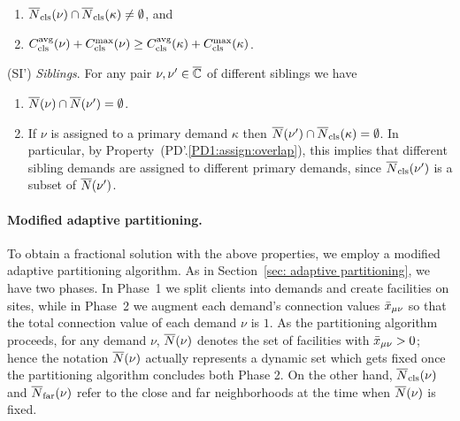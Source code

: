 \documentclass[oneside,final]{ucr}
\begin{document}
\begin{description}
\begin{enumerate}
\begin{enumerate}
				\item \label{PD1:assign:overlap} ${\overline{N}}_{{\mbox{\scriptsize\rm cls}}}(\nu) \cap {\overline{N}}_{{\mbox{\scriptsize\rm cls}}}(\kappa) \neq \emptyset$, and
				\item \label{PD1:assign:cost}
          $C_{{\mbox{\scriptsize\rm cls}}}^{{\mbox{\scriptsize\rm avg}}}(\nu)+C_{{\mbox{\scriptsize\rm cls}}}^{\max}(\nu) \geq
          C_{{\mbox{\scriptsize\rm cls}}}^{{\mbox{\scriptsize\rm avg}}}(\kappa)+C_{{\mbox{\scriptsize\rm cls}}}^{\max}(\kappa)$.
			\end{enumerate}

	\end{enumerate}
	
\item{(SI')} \emph{Siblings}. For any pair $\nu,\nu'\in\overline{\mathbb{C}}$ of different siblings we have
  \begin{enumerate}

	\item \label{SI1:siblings disjoint}
		  ${\overline{N}}(\nu)\cap {\overline{N}}(\nu') = \emptyset$.
		
	\item \label{SI1:primary disjoint} If $\nu$ is assigned to a primary demand $\kappa$ then
 		${\overline{N}}(\nu')\cap {\overline{N}}_{{\mbox{\scriptsize\rm cls}}}(\kappa) = \emptyset$. In particular, by Property~(PD'.\ref{PD1:assign:overlap}),
		this implies that different sibling demands are assigned to different primary demands, since ${\overline{N}}_{{\mbox{\scriptsize\rm cls}}}(\nu')$ is a subset of ${\overline{N}}(\nu')$.

	\end{enumerate}
	
\end{description}


\paragraph{Modified adaptive partitioning.}
To obtain a fractional solution with the above properties, we employ a
modified adaptive partitioning algorithm. As in Section~\ref{sec:
  adaptive partitioning}, we have two phases.  In Phase~1 we split
clients into demands and create facilities on sites, while in Phase~2
we augment each demand's connection values ${\bar x}_{\mu\nu}$ so that the total connection
value of each demand $\nu$ is $1$. As the partitioning algorithm proceeds, for any demand $\nu$,
${\overline{N}}(\nu)$ denotes the set of facilities with ${\bar x}_{\mu\nu} > 0$;
hence the notation ${\overline{N}}(\nu)$ actually represents a dynamic set which gets fixed 
once the partitioning algorithm concludes both Phase 2. On the
other hand, ${\overline{N}}_{{\mbox{\scriptsize\rm cls}}}(\nu)$ and ${\overline{N}}_{{\mbox{\scriptsize\rm far}}}(\nu)$ refer to the close
and far neighborhoods at the time when ${\overline{N}}(\nu)$ is fixed.
\end{document}
